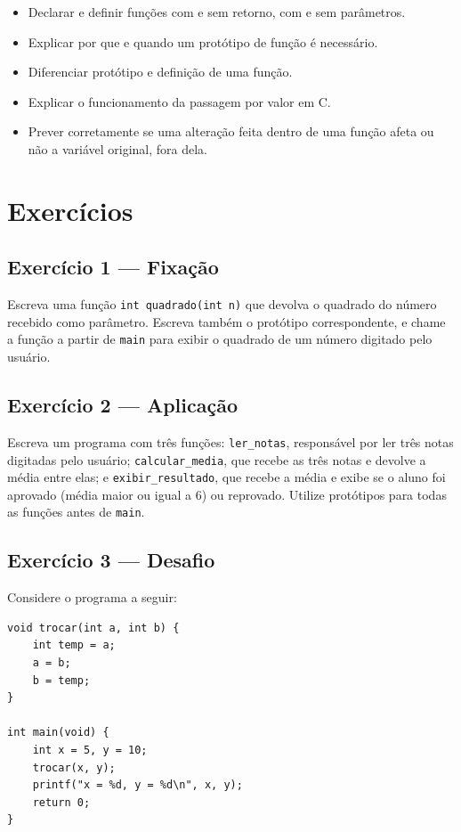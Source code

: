 \documentclass[12pt,a4paper,oneside]{extreport}
\begin{document}
\begin{tcolorbox}[title={Ao final deste capítulo, você deve ser capaz de:}]
\begin{itemize}
    \item Declarar e definir funções com e sem retorno, com e sem parâmetros.
    \item Explicar por que e quando um protótipo de função é necessário.
    \item Diferenciar protótipo e definição de uma função.
    \item Explicar o funcionamento da passagem por valor em C.
    \item Prever corretamente se uma alteração feita dentro de uma função afeta ou não a variável original, fora dela.
\end{itemize}
\end{tcolorbox}

\section*{Exercícios}

\subsection*{Exercício 1 --- Fixação}
Escreva uma função \texttt{int quadrado(int n)} que devolva o quadrado do número recebido como parâmetro. Escreva também o protótipo correspondente, e chame a função a partir de \texttt{main} para exibir o quadrado de um número digitado pelo usuário.

\subsection*{Exercício 2 --- Aplicação}
Escreva um programa com três funções: \texttt{ler\_notas}, responsável por ler três notas digitadas pelo usuário; \texttt{calcular\_media}, que recebe as três notas e devolve a média entre elas; e \texttt{exibir\_resultado}, que recebe a média e exibe se o aluno foi aprovado (média maior ou igual a 6) ou reprovado. Utilize protótipos para todas as funções antes de \texttt{main}.

\subsection*{Exercício 3 --- Desafio}
Considere o programa a seguir:

\begin{lstlisting}
void trocar(int a, int b) {
    int temp = a;
    a = b;
    b = temp;
}

int main(void) {
    int x = 5, y = 10;
    trocar(x, y);
    printf("x = %d, y = %d\n", x, y);
    return 0;
}
\end{lstlisting}
\end{document}
